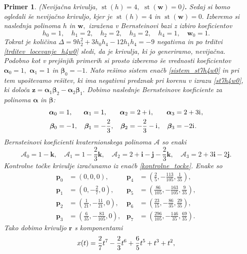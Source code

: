 \documentclass[12pt,a4paper,twoside]{article}
\newcommand{\iu}{\mathrm{i}\mkern1mu} %
\theoremstyle{definition} %
\theoremstyle{plain} %
\theoremstyle{primerstyle}
\newtheorem{primer}[definicija]{Primer}
\numberwithin{equation}{section}  %
\newcommand{\pV}{\mathbf{p}}
\newcommand{\rV}{\mathbf{r}}
\newcommand{\iV}{\mathbf{i}}
\newcommand{\jV}{\mathbf{j}}
\newcommand{\kV}{\mathbf{k}}
\newcommand{\wV}{\mathbf{w}}
\newcommand{\zV}{\mathbf{z}}
\newcommand{\AQ}{\mathcal{A}}
\newcommand{\balpha}{\boldsymbol \alpha}
\newcommand{\bbeta}{\boldsymbol \beta}
\DeclareMathOperator{\st}{st}
\begin{document}
\begin{primer}
	\label{primer_h4w0_nevijacna}
	\textnormal{ }(Nevijačna krivulja, $\st(h)=4,$ $\st(\wV)=0$)\textbf{.}
	Sedaj si bomo ogledali še nevijačno krivuljo, kjer je $\st(h)=4$ in $\st(\wV)=0.$ Izberemo si naslednja polinoma $h$ in $\wV,$ izražena v Bernsteinovi bazi z izbiro koeficientov
	\begin{equation*}
		h_0=1,\quad h_1=2,\quad h_2=2,\quad h_3=2,\quad h_4=1,\quad \wV_0=1.
	\end{equation*}
	Tokrat je količina $\Delta=9h_2^2+3h_0h_4-12h_1h_4=-9$ negativna in po trditvi \ref{trditev_locevanje_h4w0} sledi, da je krivulja, ki jo generiramo, nevijačna. Podobno kot v prejšnjih primerih si prosto izberemo še vrednosti koeficientov $\balpha_0=1,$ $\balpha_1=1$ in $\bbeta_0=-1.$ Nato rešimo sistem enačb \eqref{sistem_st7h4w0} in pri tem upoštevamo rešitev, ki ima negativni predznak pri korenu v izrazu \eqref{st7h4w0}, ki določa $\zV=\balpha_1\bbeta_2-\balpha_2\bbeta_1.$ Dobimo naslednje Bernsteinove koeficiente za polinoma $\balpha$ in $\bbeta$:
	\begin{align*}
		\balpha_0&=1,&\balpha_1&=1,&\balpha_2&=2+\iu,&\balpha_3&=2+3\iu,\\
		\bbeta_0&=-1,&\bbeta_1&=-\frac{2}{3},&\bbeta_2&=-\frac{2}{3}-\iu,&\bbeta_3&=-2\iu.
	\end{align*}
	Bernsteinovi koeficienti kvaternionskega polinoma $\AQ$ so enaki
	\begin{equation*}
		\AQ_0=1-\kV,\quad\AQ_1=1-\frac{2}{3}\kV,\quad\AQ_2=2+\iV-\jV-\frac{2}{3}\kV,\quad\AQ_3=2+3\iV-2\jV.
	\end{equation*}
	Kontrolne točke krivulje izračunamo iz enačb \eqref{kontrolne_tocke}. Enake so
	\begin{align*}
		\pV_0&=(0,0,0),&\pV_4&=\left(\frac{2}{5},-\frac{113}{105},\frac{1}{35}\right)\!,\\
		\pV_1&=\left(0,-\frac{2}{7},0\right)\!,&\pV_5&=\left(\frac{86}{105},-\frac{163}{105},\frac{9}{35}\right)\!,\\
		\pV_2&=\left(\frac{1}{21},-\frac{11}{21},0\right)\!,&\pV_6&=\left(\frac{23}{15},-\frac{86}{35},\frac{29}{35}\right)\!,\\
		\pV_3&=\left(\frac{6}{35},-\frac{83}{105},0\right)\!,&\pV_7&=\left(\frac{296}{105},-\frac{146}{35},\frac{69}{35}\right)\!.
	\end{align*}
	Tako dobimo krivuljo $\rV$ s komponentami
	\begin{align}
		x(t)&=\frac{2}{7}t^7-\frac{2}{3}t^6+\frac{6}{5}t^5+t^3+t^2,\notag\\

\end{align}
\end{primer}
\end{document}
